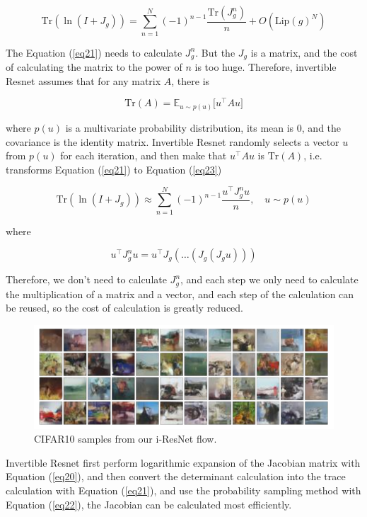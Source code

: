 \documentclass[final]{cvpr}
\begin{document}
\begin{equation}
   \text{Tr}(\ln (I + J_g)) = \sum_{n=1}^{N}(-1)^{n-1}\frac{\text{Tr}(J_g^n)}{n}+O\left(\text{Lip}(g)^N\right)
   \label{eq21}
\end{equation}

The Equation (\ref{eq21}) needs to calculate $J_g^n$. But the $J_g$ is a matrix, and the cost of calculating the matrix to the power of $n$ is too huge. Therefore, invertible Resnet assumes that for any matrix $A$, there is

\begin{equation}
   \text{Tr}(A)=\mathbb{E}_{u\sim p(u)}\big[u^{\top}Au\big]
   \label{eq22}
\end{equation}

where $p(u)$ is a multivariate probability distribution, its mean is 0, and the covariance is the identity matrix. Invertible Resnet randomly selects a vector $u$ from $p(u)$ for each iteration, and then make that $u^{\top}Au$ is $\text{Tr}(A)$, i.e. transforms Equation (\ref{eq21}) to Equation (\ref{eq23})

\begin{equation}
   \text{Tr}(\ln (I + J_g)) \approx \sum_{n=1}^{N}(-1)^{n-1}\frac{u^{\top } J_g^nu}{n},\quad u\sim p(u)
   \label{eq23}
\end{equation}

where

\begin{equation}
   u^{\top} J_g^n u=u^{\top} J_g(\dots(J_g(J_g u)))
\end{equation}

Therefore, we don't need to calculate $J_g^n$, and each step we only need to calculate the multiplication of a matrix and a vector, and each step of the calculation can be reused, so the cost of calculation is greatly reduced.
\begin{figure}
   \begin{center}
   
      \includegraphics[width=1.0\linewidth]{image-20210526232348670.png}
   \end{center}
      \caption{CIFAR10 samples from our i-ResNet flow.}
   \label{fig:4}
\end{figure}
Invertible Resnet first perform logarithmic expansion of the Jacobian matrix with Equation (\ref{eq20}), and then convert the determinant calculation into the trace calculation with Equation (\ref{eq21}), and use the probability sampling method with Equation (\ref{eq22}), the Jacobian can be calculated most efficiently.
\end{document}
